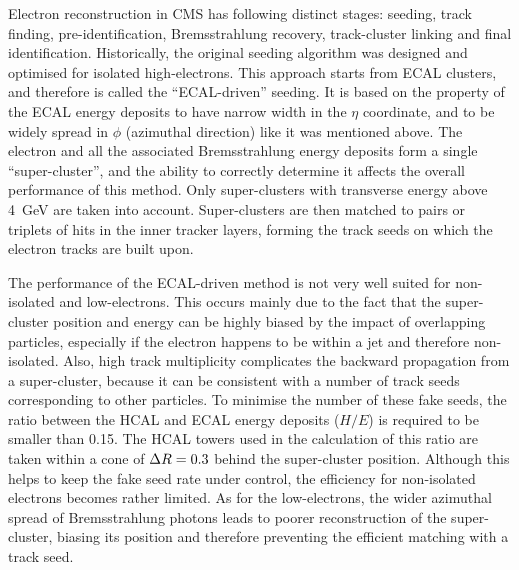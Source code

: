Electron reconstruction in CMS has following distinct stages: seeding, track finding, pre-identification, Bremsstrahlung
recovery, track-cluster linking and final identification. Historically, the original seeding algorithm was designed and
optimised for isolated high-\pt electrons. This approach starts from ECAL clusters, and therefore is called the
``ECAL-driven'' seeding. It is based on the property of the ECAL energy deposits to have narrow width in the $\eta$
coordinate, and to be widely spread in $\phi$ (azimuthal direction) like it was mentioned above. The electron and all
the associated Bremsstrahlung energy deposits form a single ``super-cluster'', and the ability to correctly determine it
affects the overall performance of this method. Only super-clusters with transverse energy above \SI{4}{\GeV} are taken
into account. Super-clusters are then matched to pairs or triplets of hits in the inner tracker layers, forming the
track seeds on which the electron tracks are built upon.

The performance of the ECAL-driven method is not very well suited for non-isolated and low-\pt electrons. This occurs
mainly due to the fact that the super-cluster position and energy can be highly biased by the impact of overlapping
particles, especially if the electron happens to be within a jet and therefore non-isolated. Also, high track
multiplicity complicates the backward propagation from a super-cluster, because it can be consistent with a number of
track seeds corresponding to other particles. To minimise the number of these fake seeds, the ratio between the HCAL and
ECAL energy deposits ($H/E$) is required to be smaller than \num{0.15}. The HCAL towers used in the calculation of this
ratio are taken within a cone of $\Delta R = 0.3$ behind the super-cluster position. Although this helps to keep the fake
seed rate under control, the efficiency for non-isolated electrons becomes rather limited. As for the low-\pt electrons,
the wider azimuthal spread of Bremsstrahlung photons leads to poorer reconstruction of the super-cluster, biasing its
position and therefore preventing the efficient matching with a track seed.

